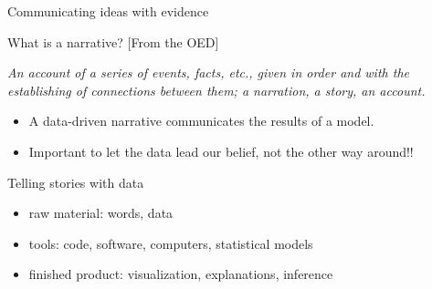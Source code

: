 \documentclass[table]{beamer}\usepackage[]{graphicx}\usepackage[]{color}
\begin{document}
\begin{frame}{Communicating ideas with evidence}

\begin{block}{What is a narrative? [From the OED]}

\em An account of a series of events, facts, etc., given in order and with the establishing of connections between them; a narration, a story, an account.

\em
\begin{itemize}
  \item A data-driven narrative communicates the results of a model.
  \item Important to let the data lead our belief, not the other way around!!
\end{itemize}

\end{block}

\bigskip

\begin{block}{Telling stories with data}

\begin{itemize}
	\item raw material: words, data
	\item tools: code, software, computers, statistical models
	\item finished product: visualization, explanations, inference
\end{itemize}

\end{block}


\end{frame}



%
%
%

\end{document}
